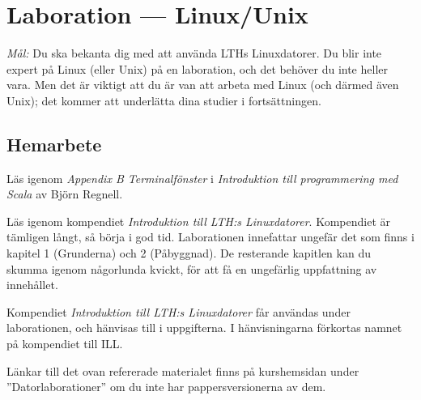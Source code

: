 \section{Laboration  --- Linux/Unix}
\label{lab:unix}
\emph{Mål:} Du ska bekanta dig med att använda LTHs Linuxdatorer. Du blir inte expert på Linux (eller Unix) på en laboration, och det behöver du inte heller vara. Men det är viktigt att du är van att arbeta med Linux (och därmed även Unix); det kommer att underlätta dina studier i fortsättningen.


\subsection*{Hemarbete}
\begin{Hemarbete}
	\item Läs igenom \emph{Appendix B Terminalfönster} i \emph{Introduktion till programmering med Scala} av Björn Regnell.
	\item Läs igenom kompendiet  \emph{Introduktion till LTH:s Linuxdatorer}. Kompendiet är tämligen långt, så börja i god tid. Laborationen innefattar ungefär det som finns i kapitel 1 (Grunderna) och 2 (Påbyggnad). De resterande kapitlen kan du skumma igenom  någorlunda kvickt, för att få en ungefärlig uppfattning av innehållet.
	\item Kompendiet \emph{Introduktion till LTH:s Linuxdatorer} får användas under laborationen, och hänvisas till i uppgifterna. I hänvisningarna förkortas namnet på  kompendiet till ILL.
\end{Hemarbete}
Länkar till det ovan refererade materialet finns på kurshemsidan under  ''Datorlaborationer'' om du inte har pappersversionerna av dem.


